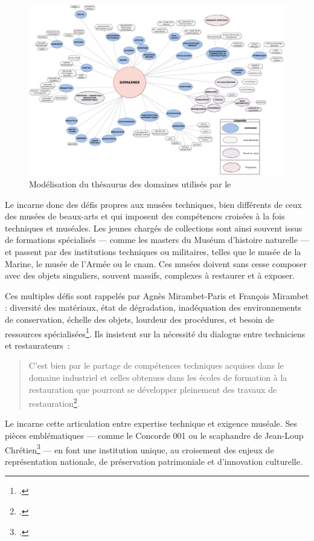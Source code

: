 \begin{figure}[htbp]
	\centering
	\includegraphics[width=\linewidth]{img/MODEL_domaines.png}
	\caption{Modélisation du thésaurus des domaines utilisés par le \mae}
	\label{fig:model_domaines}
\end{figure}

Le \mae incarne donc des défis propres aux musées techniques, bien différents de ceux des musées de beaux-arts et qui imposent des compétences croisées à la fois techniques et muséales. Les jeunes chargés de collections sont ainsi souvent issus de formations spécialisés — comme les masters du Muséum d’histoire naturelle — et passent par des institutions techniques ou militaires, telles que le musée de la Marine, le musée de l’Armée ou le \ac{cnam}. Ces musées doivent sans cesse composer avec des objets singuliers, souvent massifs, complexes à restaurer et à exposer.

Ces multiples défis sont rappelés par Agnès Mirambet-Paris et François Mirambet : diversité des matériaux, état de dégradation, inadéquation des environnements de conservation, échelle des objets, lourdeur des procédures, et besoin de ressources spécialisées\footcite{mirambet-parisConservationrestaurationPatrimoineTechnique2011}. Ils insistent sur la nécessité du dialogue entre techniciens et restaurateurs :
\begin{quote}
	\og C’est bien par le partage de compétences techniques acquises dans le domaine industriel et celles obtenues dans les écoles de formation à la restauration que pourront se développer pleinement des travaux de restauration\footcite{mirambet-parisConservationrestaurationPatrimoineTechnique2011}.\fg
\end{quote}

Le \mae incarne cette articulation entre expertise technique et exigence muséale. Ses pièces emblématiques — comme le Concorde 001 ou le scaphandre de Jean-Loup Chrétien\footcite{champenoisTresorsMuseeLair} — en font une institution unique, au croisement des enjeux de représentation nationale, de préservation patrimoniale et d’innovation culturelle.
